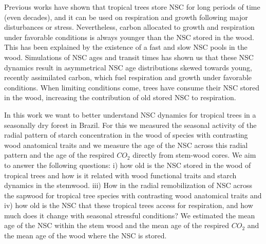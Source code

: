 \documentclass{article}
\begin{document}
Previous works have shown that tropical trees store NSC for long periods of time (even decades), and it can be used on respiration and growth following major disturbances or stress. 
Nevertheless, carbon allocated to growth and respiration under favorable conditions is always younger than the NSC stored in the wood. 
This has been explained by the existence of a fast and slow NSC pools in the wood. 
Simulations of NSC ages and transit times has shown us that these NSC dynamics result in asymmetrical NSC age distributions skewed towards young, recently assimilated carbon, which  fuel respiration and growth under favorable conditions. 
When limiting conditions come, trees have consume their NSC stored in the wood, increasing the contribution of old stored NSC to respiration. 



In this work we want to better understand NSC dynamics for tropical trees in a seasonally dry forest in Brazil. For this we measured the seasonal activity of the radial pattern of starch concentration in the wood of species with contrasting wood anatomical traits and we measure the age of the NSC across this radial pattern and the age of the respired $CO_{2}$ directly from  stem-wood cores. We aim to answer the following questions: 
i) how old is the NSC stored in the wood of tropical trees and how is it related with wood functional traits and starch dynamics in the stemwood. 
iii) How in the radial remobilization of NSC across the sapwood for tropical tree species with contrasting wood anatomical traits and 
iv) how old is the NSC that these tropical trees access for respiration, and how much does it change with seasonal stressful conditions? 
We estimated the mean age of the NSC within the stem wood and the mean age of the respired $CO_{2}$ and the mean age of the wood where the NSC is stored. 
\end{document}
